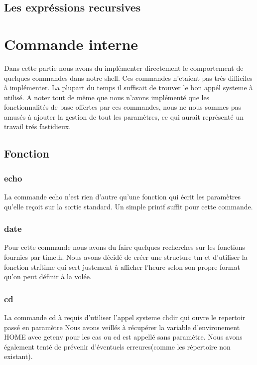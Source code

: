 \documentclass[12pt]{article}
\begin{document}
\subsection{Les expréssions recursives}


\newpage
\section{Commande interne}

Dans cette partie nous avons du implémenter directement le comportement de quelques
commandes dans notre shell. Ces commandes n'etaient pas trés difficiles à implémenter. La plupart
du temps il suffisait de trouver le bon appél systeme à utilisé. A noter tout de même
que nous n'avons implémenté que les fonctionnalités de base offertes par ces commandes, nous
ne nous sommes pas amusés à ajouter la gestion de tout les paramètres, ce qui aurait 
représenté un travail trés fastidieux.

\subsection{Fonction}
\subsubsection{echo}
 La commande echo n'est rien d'autre qu'une fonction qui écrit les paramètres qu'elle reçoit
 sur la sortie standard. Un simple printf suffit pour cette commande.
 
\subsubsection{date}
 Pour cette commande nous avons du faire quelques recherches sur les fonctions fournies par time.h.
 Nous avons décidé de créer une structure tm et d'utiliser la fonction strftime qui
 sert justement à afficher l'heure selon son propre format qu'on peut définir à la volée.
 
 \subsubsection{cd}
 La commande cd à requis d'utiliser l'appel systeme chdir qui ouvre le repertoir passé en paramètre
 Nous avons veillés à récupérer la variable d'environement HOME avec getenv pour les cas ou cd est
 appellé sans paramètre. Nous avons également tenté de prévenir d'éventuels erreures(comme les
 répertoire non existant).
 
\end{document}
